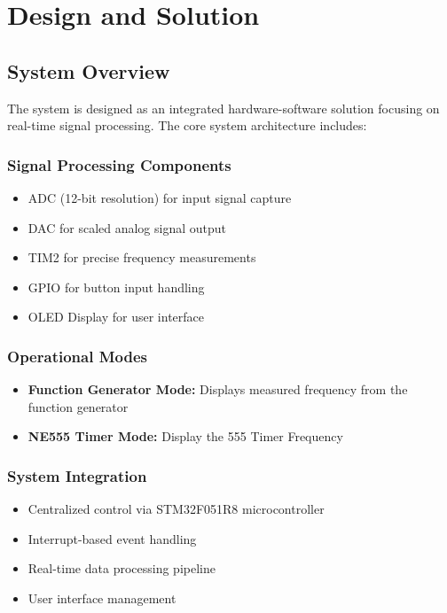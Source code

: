 \section{Design and Solution}

\subsection{System Overview}
The system is designed as an integrated hardware-software solution focusing on real-time signal processing. The core system architecture includes:

\subsubsection{Signal Processing Components}
\begin{itemize}
    \item ADC (12-bit resolution) for input signal capture
    \item DAC for scaled analog signal output
    \item TIM2 for precise frequency measurements
    \item GPIO for button input handling
    \item OLED Display for user interface
\end{itemize}

\subsubsection{Operational Modes}
\begin{itemize}
    \item \textbf{Function Generator Mode:} Displays measured frequency from the function generator
    \item \textbf{NE555 Timer Mode:} Display the 555 Timer Frequency
\end{itemize}

\subsubsection{System Integration}
\begin{itemize}
    \item Centralized control via STM32F051R8 microcontroller
    \item Interrupt-based event handling
    \item Real-time data processing pipeline
    \item User interface management
\end{itemize}

